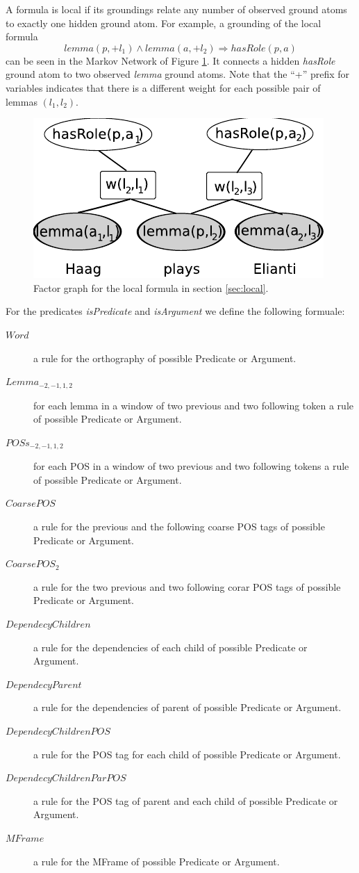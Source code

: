 A formula is local if its groundings relate any number of observed ground atoms to exactly one hidden ground atom. For example, a grounding of the local formula 
\[lemma(p,+l_1) \wedge lemma(a,+l_2) \Rightarrow hasRole(p,a)\]
can be seen in the Markov Network of Figure \ref{fig:local2}. It connects a hidden \emph{hasRole} ground atom to two observed \emph{lemma} ground atoms. Note that the ``+'' prefix for variables indicates that there is a different weight for each possible pair of lemmas $(l_1,l_2)$.

\begin{figure}
\begin{center}
    \includegraphics[scale=.70]{LocalFormula2}
\end{center}
\caption{Factor graph for the local formula in section \ref{sec:local}.}
\label{fig:local2}
\end{figure}

For the predicates \emph{isPredicate} and \emph{isArgument} we define the
following formuale:
\begin{description}
    \item[$Word$] a rule for the orthography of possible Predicate or Argument.
    \item[$Lemma_{-2,-1,1,2}$] for each lemma in a window of two previous and two following token a rule of possible Predicate or Argument.
    \item[$POSs_{-2,-1,1,2}$] for each POS in a window of two previous and two following tokens a rule of possible Predicate or Argument.
    \item[$CoarsePOS$] a rule for the previous and the following coarse POS tags of possible Predicate or Argument.
    \item[$CoarsePOS_2$] a rule for the two previous and two following corar POS tags of possible Predicate or Argument.
    \item[$DependecyChildren$] a rule for the dependencies of each child of possible Predicate or Argument.
    \item[$DependecyParent$] a rule for the dependencies of parent of possible Predicate or Argument.
    \item[$DependecyChildrenPOS$] a rule for the POS tag for each child  of possible Predicate or Argument.
    \item[$DependecyChildrenParPOS$] a rule for the POS tag of parent and each child  of possible Predicate or Argument.
    \item[$MFrame$] a rule for the MFrame of possible Predicate or Argument.
\end{description}




